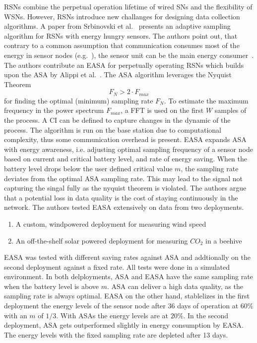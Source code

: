 \acp{RSN} combine the perpetual operation lifetime of wired \acp{SN} and the
flexibility of \acp{WSN}. However, \acp{RSN} introduce new challanges for
designing data collection algorithms. A paper from Srbinovski et
al.~\cite{srbinovski2016energy} presents an adaptive sampling algorithm for
\acp{RSN} with energy hungry sensors. The authors point out, that contrary to a
common assumption that communication consumes most of the energy in sensor
nodes (e.g.~\cite{santini2006adaptive}), the sensor unit can be the main energy
consumer~\cite{boyle2012energy}. The authors contribute an \ac{EASA} for
perpetually operating \acp{RSN} which builds upon the \ac{ASA} by Alippi et
al.~\cite{alippi2007adaptive}. The \ac{ASA} algorithm leverages the Nyquist
Theorem $$ F_N > 2 \cdot F_{max} $$ for finding the optimal (minimum) sampling rate
$ F_N $. To estimate the maximum frequency in the power spectrum $ F_{max} $, a
\ac{FFT} is used on the first $ W $ samples of the process. A \ac{CI} can be
defined to capture changes in the dynamic of the process. The algorithm is run
on the base station due to computational complexity, thus some communication
overhead is present. \ac{EASA} expands \ac{ASA} with energy awareness, i.e.
adjusting optimal sampling frequency of a sensor node based on current and
critical battery level, and rate of energy saving. When the battery level drops
below the user defined critical value $ m $, the sampling rate deviates from the
optimal \ac{ASA} sampling rate. This may lead to the signal not capturing the
singal fully as the nyquist theorem is violated. The authors argue that a
potential loss in data quality is the cost of staying continuously in the
network. The authors tested \ac{EASA} extensively on data from two deployments.

\begin{enumerate}
    \item A custom, windpowered deployment for measuring wind speed
    \item An off-the-shelf solar powered deployment for measuring $ CO_2 $ in a beehive
\end{enumerate}

\ac{EASA} was tested with different saving rates against \ac{ASA} and
addtionally on the second deployment against a fixed rate. All tests were done
in a simulated environment. In both delployments, \ac{ASA} and \ac{EASA} have
the same sampling rate when the battery level is above $ m $. \ac{ASA} can
deliver a high data quality, as the sampling rate is always optimal. \ac{EASA}
on the other hand, stablelizes in the first deployment the energy levels of the
sensor node after 36 days of operation at $ 60\% $ with an $ m $ of $ 1/3 $.
With \acp{ASA} the energy levels are at $ 20\% $. In the second deployment,
\ac{ASA} gets outperformed slightly in energy consumption by \ac{EASA}. The
energy levels with the fixed sampling rate are depleted after 13 days.

